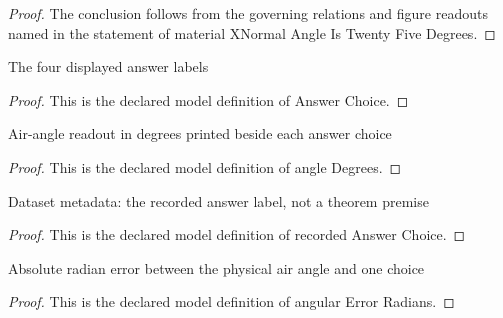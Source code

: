 \begin{proof}
  The conclusion follows from the governing relations and figure readouts named in the statement of material XNormal Angle Is Twenty Five Degrees.
\end{proof}
\begin{definition}
  \label{def:physics:phyx-mini-0091:phyxminiproblems-problemphyxmini0091-answerchoice}
  The four displayed answer labels
\end{definition}
\begin{proof}
  This is the declared model definition of Answer Choice.
\end{proof}
\begin{definition}
  \label{def:physics:phyx-mini-0091:phyxminiproblems-problemphyxmini0091-answerchoice-angledegrees}
  Air-angle readout in degrees printed beside each answer choice
\end{definition}
\begin{proof}
  This is the declared model definition of angle Degrees.
\end{proof}
\begin{definition}
  \label{def:physics:phyx-mini-0091:phyxminiproblems-problemphyxmini0091-recordedanswerchoice}
  Dataset metadata: the recorded answer label, not a theorem premise
\end{definition}
\begin{proof}
  This is the declared model definition of recorded Answer Choice.
\end{proof}
\begin{definition}
  \label{def:physics:phyx-mini-0091:phyxminiproblems-problemphyxmini0091-angularerrorradians}
  Absolute radian error between the physical air angle and one choice
\end{definition}
\begin{proof}
  This is the declared model definition of angular Error Radians.
\end{proof}
